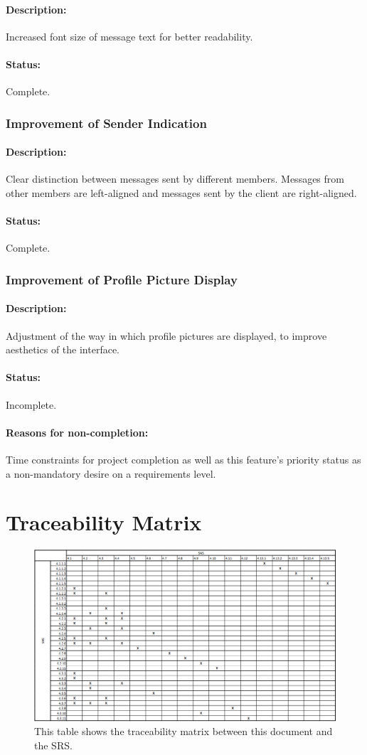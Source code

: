 \documentclass[11pt]{article}
\begin{document}
\paragraph{Description:} Increased font size of message text for better readability.
\paragraph{Status:} Complete. 

\subsubsection{Improvement of Sender Indication}
\paragraph{Description:} Clear distinction between messages sent by different members. Messages from other members are left-aligned and messages sent by the client are right-aligned.
\paragraph{Status:} Complete.

\subsubsection{Improvement of Profile Picture Display}
\paragraph{Description:} Adjustment of the way in which profile pictures are displayed, to improve aesthetics of the interface.
\paragraph{Status:} Incomplete.
\paragraph{Reasons for non-completion:} Time constraints for project completion as well as this feature's priority status as a non-mandatory desire on a requirements level.

\section{Traceability Matrix}

\begin{figure}[H]
\centering
\includegraphics[width=6in]{./images/trace.png}
\caption[Traceability Matrix]{This table shows the traceability matrix between this document and the SRS.}
\label{tbl-trace-2}
\end{figure}
\end{document}
